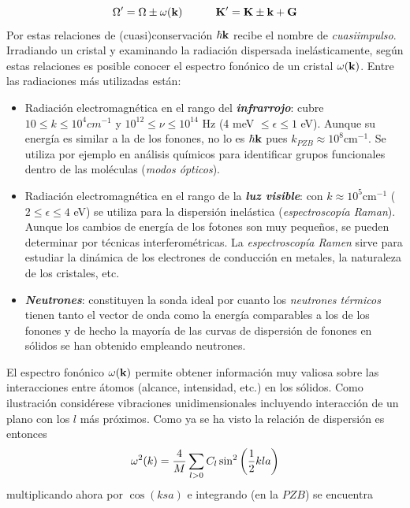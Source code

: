 \begin{equation}
    \Omega' = \Omega \pm \omega (\mathbf{k}) \quad \quad \quad \mathbf{K}' = \mathbf{K} \pm \mathbf{k} + \mathbf{G}
\end{equation}
Por estas relaciones de (cuasi)conservación $\hbar \mathbf{k}$ recibe el nombre de \textit{cuasiimpulso}. Irradiando un cristal y examinando la radiación dispersada inelásticamente, según estas relaciones es posible conocer el espectro fonónico de un cristal $\omega (\mathbf{k})$. Entre las radiaciones más utilizadas están:

\begin{itemize}
    \item Radiación electromagnética en el rango del \textbf{\textit{infrarrojo}}: cubre $10\le k \le 10^4 \unit{cm^{-1}}$ y $10^{12} \leq \nu \leq 10^{14}$ Hz (4 meV $\leq \epsilon \leq 1$ eV). Aunque su energía es similar a la de los fonones, no lo es $\hbar \mathbf{k}$ pues $k_{PZB} \approx 10^8  \unit{\cm^{-1}}$. Se utiliza por ejemplo en análisis químicos para identificar grupos funcionales dentro de las moléculas (\textit{modos ópticos}).
    \item Radiación electromagnética en el rango de la \textbf{\textit{luz visible}}: con $k\approx 10^5 \unit{\cm^{-1}}$ ($2\leq \epsilon \leq 4$ eV) se utiliza para la dispersión inelástica (\textit{espectroscopía Raman}). Aunque los cambios de energía de los fotones son muy pequeños, se pueden determinar por técnicas interferométricas. La \textit{espectroscopía Ramen} sirve para estudiar la dinámica de los electrones de conducción en metales, la naturaleza de los cristales, etc.
    \item \textbf{\textit{Neutrones}}: constituyen la sonda ideal por cuanto los \textit{neutrones térmicos} tienen tanto el vector de onda como la energía comparables a los de los fonones y de hecho la mayoría de las curvas de dispersión de fonones en sólidos se han obtenido empleando neutrones.
\end{itemize}


El espectro fonónico $\omega (\mathbf{k})$ permite obtener información muy valiosa sobre las interacciones entre átomos (alcance, intensidad, etc.) en los sólidos. Como ilustración considérese vibraciones unidimensionales incluyendo interacción de un plano con los $l$ más próximos. Como ya se ha visto la relación de dispersión es entonces
\begin{equation}
    \omega^2 (k) = \frac{4}{M} \sum_{l>0} C_l \sin^2 \left( \frac{1}{2} k la \right)
\end{equation}
multiplicando ahora por $\cos (ksa)$ e integrando (en la $PZB$) se encuentra

